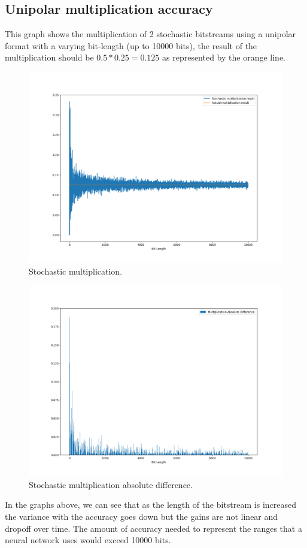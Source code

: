 \documentclass[a4paper,oneside,phd,etd]{BYUPhys}
\begin{document}
\subsection{Unipolar multiplication accuracy}
This graph shows the multiplication of 2 stochastic bitstreams using a unipolar format with a varying bit-length (up to 10000 bits), the result of the multiplication should be $0.5*0.25=0.125$ as represented by the orange line.
\begin{figure}[H]
\centering
\includegraphics[scale=0.4]{results/Figure_1.png}
\caption{Stochastic multiplication.}
\label{fig:mult}
\end{figure}
\begin{figure}[H]
\centering
\includegraphics[scale=0.4]{results/Figure_1-abs.png}
\caption{Stochastic multiplication absolute difference.}
\label{fig:abs_mult}
\end{figure}
In the graphs above, we can see that as the length of the bitstream is increased the variance with the accuracy goes down but the gains are not linear and dropoff over time. The amount of accuracy needed to represent the ranges that a neural network uses would exceed 10000 bits.
\end{document}
